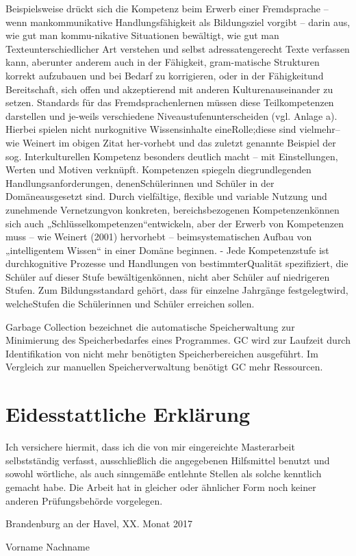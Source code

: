 \documentclass[
12pt,
english,
ngerman,
headsepline,
twoside,
openright,
numbers=noenddot,version=first
]{scrreprt}
\begin{document}
Beispielsweise drückt sich die Kompetenz beim Erwerb einer Fremdsprache – wenn mankommunikative Handlungsfähigkeit als Bildungsziel vorgibt – darin aus, wie gut man kommu-nikative Situationen bewältigt, wie gut man Texteunterschiedlicher Art verstehen und selbst adressatengerecht Texte verfassen kann, aberunter anderem auch in der Fähigkeit, gram-matische Strukturen korrekt aufzubauen und bei Bedarf zu korrigieren, oder in der Fähigkeitund Bereitschaft, sich offen und akzeptierend mit anderen Kulturenauseinander zu setzen. Standards für das Fremdsprachenlernen müssen diese Teilkompetenzen darstellen und je-weils verschiedene Niveaustufenunterscheiden (vgl. Anlage a). Hierbei spielen nicht nurkognitive Wissensinhalte eineRolle;diese sind vielmehr– wie Weinert im obigen Zitat her-vorhebt und das zuletzt genannte Beispiel der sog. Interkulturellen Kompetenz besonders deutlich macht – mit Einstellungen, Werten und Motiven verknüpft.
Kompetenzen spiegeln diegrundlegenden Handlungsanforderungen, denenSchülerinnen und Schüler in der Domäneausgesetzt sind. Durch vielfältige, flexible und variable Nutzung und zunehmende Vernetzungvon konkreten, bereichsbezogenen Kompetenzenkönnen sich auch „Schlüsselkompetenzen“entwickeln, aber der Erwerb von Kompetenzen muss – wie Weinert (2001) hervorhebt – beimsystematischen Aufbau von „intelligentem Wissen“ in einer Domäne beginnen.
- Jede Kompetenzstufe ist durchkognitive Prozesse und Handlungen von bestimmterQualität spezifiziert, die Schüler auf dieser Stufe bewältigenkönnen, nicht aber Schüler auf niedrigeren Stufen. Zum Bildungsstandard gehört, dass für einzelne Jahrgänge festgelegtwird, welcheStufen die Schülerinnen und Schüler erreichen sollen.
\begin{acronym}[Bash]
	


\glqq Garbage Collection\grqq{} bezeichnet die automatische Speicherwaltung zur Minimierung des Speicherbedarfes eines Programmes.
\ac{GC} wird zur Laufzeit durch Identifikation von nicht mehr benötigten Speicherbereichen ausgeführt.
Im Vergleich zur manuellen Speicherverwaltung benötigt \ac{GC} mehr Ressourcen.

\end{acronym}





\chapter*{Eidesstattliche Erklärung}

Ich versichere hiermit, dass ich die von mir eingereichte Masterarbeit selbstständig verfasst, ausschließlich die angegebenen Hilfsmittel benutzt und sowohl wörtliche, als auch sinngemäße entlehnte Stellen als solche kenntlich gemacht habe. Die Arbeit hat in gleicher oder ähnlicher Form noch keiner anderen Prüfungsbehörde vorgelegen.

Brandenburg an der Havel, XX. Monat 2017

\vspace{3cm}

Vorname Nachname
\end{document}
